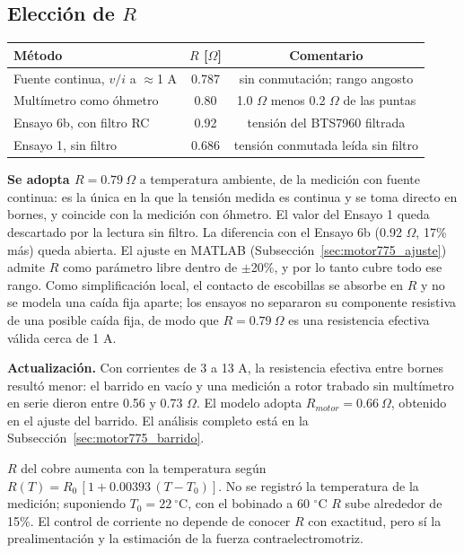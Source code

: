 \subsection{Elección de $R$}
\label{sec:motor775_r}
\begin{center}
\begin{tabular}{lcc}\toprule
Método & $R$ [$\Omega$] & Comentario\\\midrule
Fuente continua, $v/i$ a $\approx$1 A & 0.787 & sin conmutación; rango angosto\\
Multímetro como óhmetro & 0.80 & 1.0 $\Omega$ menos 0.2 $\Omega$ de las puntas\\
Ensayo 6b, con filtro RC & 0.92 & tensión del BTS7960 filtrada\\
Ensayo 1, sin filtro & 0.686 & tensión conmutada leída sin filtro\\\bottomrule
\end{tabular}
\end{center}

\textbf{Se adopta $R = 0.79\ \Omega$} a temperatura ambiente, de la medición con fuente continua: es la única en la que la tensión medida es continua y se toma directo en bornes, y coincide con la medición con óhmetro. El valor del Ensayo 1 queda descartado por la lectura sin filtro. La diferencia con el Ensayo 6b (0.92 $\Omega$, 17\% más) queda abierta. El ajuste en MATLAB (Subsección~\ref{sec:motor775_ajuste}) admite $R$ como parámetro libre dentro de $\pm$20\%, y por lo tanto cubre todo ese rango. Como simplificación local, el contacto de escobillas se absorbe en $R$ y no se modela una caída fija aparte; los ensayos no separaron su componente resistiva de una posible caída fija, de modo que $R = 0.79\ \Omega$ es una resistencia efectiva válida cerca de 1 A.

\textbf{Actualización.} Con corrientes de 3 a 13 A, la resistencia efectiva entre bornes resultó menor: el barrido en vacío y una medición a rotor trabado sin multímetro en serie dieron entre 0.56 y 0.73 $\Omega$. El modelo adopta $R_{motor} = 0.66\ \Omega$, obtenido en el ajuste del barrido. El análisis completo está en la Subsección~\ref{sec:motor775_barrido}.

$R$ del cobre aumenta con la temperatura según $R(T) = R_0\,[1 + 0.00393\,(T - T_0)]$. No se registró la temperatura de la medición; suponiendo $T_0 = 22\ ^\circ$C, con el bobinado a 60 $^\circ$C $R$ sube alrededor de 15\%. El control de corriente no depende de conocer $R$ con exactitud, pero sí la prealimentación y la estimación de la fuerza contraelectromotriz.

